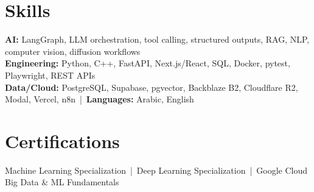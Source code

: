 \documentclass[letterpaper]{article}
\begin{document}
\section*{Skills}
\textbf{AI:} LangGraph, LLM orchestration, tool calling, structured outputs, RAG, NLP, computer vision, diffusion workflows\\
\textbf{Engineering:} Python, C++, FastAPI, Next.js/React, SQL, Docker, pytest, Playwright, REST APIs\\
\textbf{Data/Cloud:} PostgreSQL, Supabase, pgvector, Backblaze B2, Cloudflare R2, Modal, Vercel, n8n \,|\, \textbf{Languages:} Arabic, English

\section*{Certifications}
Machine Learning Specialization \,|\, Deep Learning Specialization \,|\, Google Cloud Big Data \& ML Fundamentals
\end{document}
